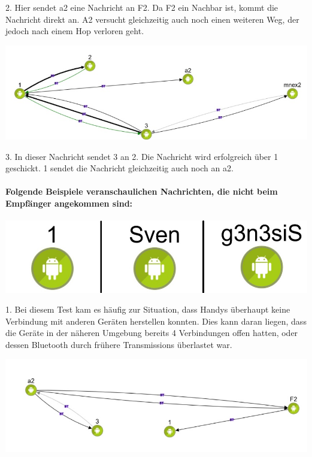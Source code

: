 2. Hier sendet a2 eine Nachricht an F2. Da F2 ein Nachbar ist, kommt die
Nachricht direkt an. A2 versucht gleichzeitig auch noch einen weiteren
Weg, der jedoch nach einem Hop verloren geht.

\includegraphics[width=1.0\textwidth]{belege/grosstests/Bilder/Grosstest2/Test1Erfolg3.jpg}

3. In dieser Nachricht sendet 3 an 2. Die Nachricht wird erfolgreich über 1
geschickt. 1 sendet die Nachricht gleichzeitig auch noch an a2.

\paragraph{Folgende Beispiele veranschaulichen Nachrichten, die nicht beim
Empfänger angekommen sind:}

\includegraphics[width=1.0\textwidth]{belege/grosstests/Bilder/Grosstest2/Test1Misserfolg2.jpg}

1. Bei diesem Test kam es häufig zur Situation, dass Handys überhaupt keine
Verbindung mit anderen Geräten herstellen konnten. Dies kann daran
liegen, dass die Geräte in der näheren Umgebung bereits 4 Verbindungen
offen hatten, oder dessen Bluetooth durch frühere Transmissions
überlastet war.

\includegraphics[width=1.0\textwidth]{belege/grosstests/Bilder/Grosstest2/Test1Misserfolg1.jpg}

